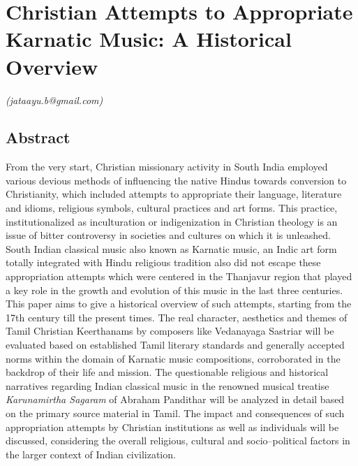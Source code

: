 
\chapter{Christian Attempts to Appropriate Karnatic Music: A Historical Overview}\label{chapter5}


\begin{flushright}
\textit{(jataayu.b@gmail.com)}
\end{flushright}


\section*{Abstract}

From the very start, Christian missionary activity in South India employed various devious methods of influencing the native Hindus towards conversion to Christianity, which included attempts to appropriate their language, literature and idioms, religious symbols, cultural practices and art forms. This practice, institutionalized as inculturation or indigenization in Christian theology is an issue of bitter controversy in societies and cultures on which it is unleashed. South Indian classical music also known as Karnatic music, an Indic art form totally integrated with Hindu religious tradition also did not escape these appropriation attempts which were centered in the Thanjavur region that played a key role in the growth and evolution of this music in the last three centuries. This paper aims to give a historical overview of such attempts, starting from the 17th century till the present times. The real character, aesthetics and themes of Tamil Christian Keerthanams by composers like Vedanayaga Sastriar will be evaluated based on established Tamil literary standards and generally accepted norms within the domain of Karnatic music compositions, corroborated in the backdrop of their life and mission. The questionable religious and historical narratives regarding Indian classical music in the renowned musical treatise \textit{Karunamirtha Sagaram} of Abraham Pandithar will be analyzed in detail based on the primary source material in Tamil. The impact and consequences of such appropriation attempts by Christian institutions as well as individuals will be discussed, considering the overall religious, cultural and socio–political factors in the larger context of Indian civilization.

\vspace{-.3cm}

